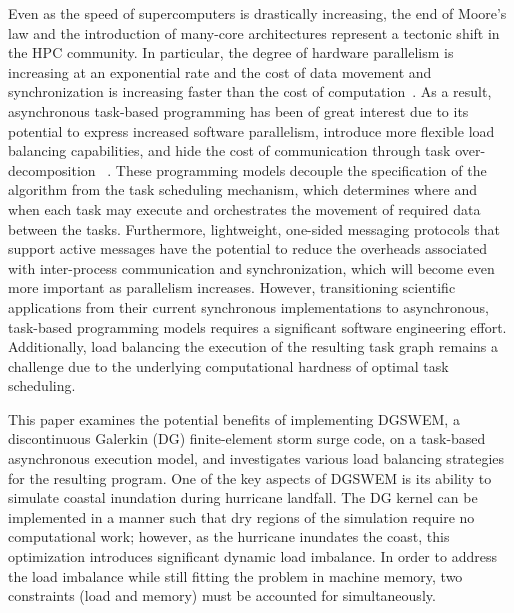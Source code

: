 Even as the speed of supercomputers is drastically increasing, the end of Moore's law and the introduction of many-core architectures represent a tectonic shift in the HPC community.
In particular, the degree of hardware parallelism is increasing at an exponential rate and the cost of data movement and synchronization is increasing faster than the cost of computation~\cite{KoggeCiSE2014}.
As a result, asynchronous task-based programming has been of great interest due to its potential to express increased software parallelism, introduce more flexible load balancing capabilities, and hide the cost of communication through task over-decomposition ~\cite{charm,hpx,legion,ocr,parsec,starpu,uintah,darma}.
These programming models decouple the specification of the algorithm from the task scheduling mechanism, which determines where and when each task may execute and orchestrates the movement of required data between the tasks.
Furthermore, lightweight, one-sided messaging protocols that support active messages have the potential to reduce the overheads associated with inter-process communication and synchronization, which will become even more important as parallelism increases.
However, transitioning scientific applications from their current synchronous implementations to asynchronous, task-based programming models requires a significant software engineering effort.
Additionally, load balancing the execution of the resulting task graph remains a challenge due to the underlying computational hardness of optimal task scheduling.

This paper examines the potential benefits of implementing DGSWEM, a discontinuous Galerkin (DG) finite-element storm surge code, on a task-based asynchronous execution model, and investigates various load balancing strategies for the resulting program.
One of the key aspects of DGSWEM is its ability to simulate coastal inundation during hurricane landfall.
The DG kernel can be implemented in a manner such that dry regions of the simulation require no computational work; however, as the hurricane inundates the coast, this optimization introduces significant dynamic load imbalance.
In order to address the load imbalance while still fitting the problem in machine memory, two constraints (load and memory) must be accounted for simultaneously.

